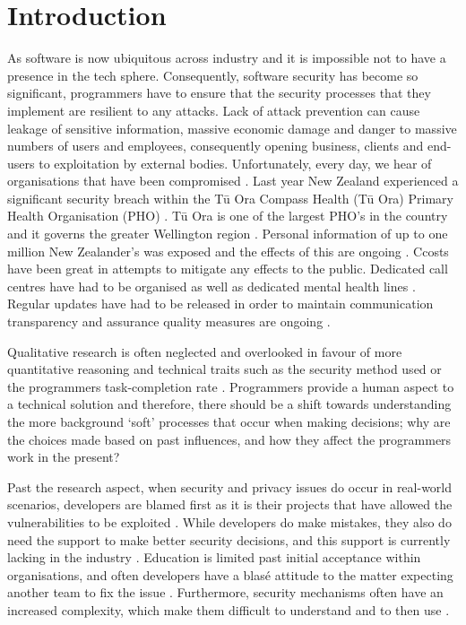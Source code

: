 \chapter{Introduction}\label{C:intro}

\par As software is now ubiquitous across industry and it is impossible not to have a presence in the tech sphere. Consequently, software security has become so significant, programmers have to ensure that the security processes that they implement are resilient to any attacks. Lack of attack prevention can cause leakage of sensitive information, massive economic damage and danger to massive numbers of users and employees, consequently opening business, clients and end-users to exploitation by external bodies. Unfortunately, every day, we hear of organisations that have been compromised \cite{1}. Last year New Zealand experienced a significant security breach within the Tū Ora Compass Health (Tū Ora) Primary Health Organisation (PHO) \cite{incident}. Tū Ora is one of the largest PHO's in the country and it governs the greater Wellington region \cite{incident}. Personal information of up to one million New Zealander's was exposed and the effects of this are ongoing \cite{incident}. Ccosts have been great in attempts to mitigate any effects to the public. Dedicated call centres have had to be organised as well as dedicated mental health lines \cite{healthpol, incident}. Regular updates have had to be released in order to maintain communication transparency and assurance quality measures are ongoing \cite{healthpol, incident}.  
\newline
\par Qualitative research is often neglected and overlooked in favour of more quantitative reasoning and technical traits such as the security method used or the programmers task-completion rate \cite{3}. Programmers provide a human aspect to a technical solution and therefore, there should be a shift towards understanding the more background ‘soft’ processes that occur when making decisions; why are the choices made based on past influences, and how they affect the programmers work in the present? 
\newline
\par Past the research aspect, when security and privacy issues do occur in real-world scenarios, developers are blamed first as it is their projects that have allowed the vulnerabilities to be exploited \cite{4}. While developers do make mistakes, they also do need the support to make better security decisions, and this support is currently lacking in the industry \cite{4}. Education is limited past initial acceptance within organisations, and often developers have a blasé attitude to the matter expecting another team to fix the issue \cite{5}. Furthermore, security mechanisms often have an increased complexity, which make them difficult to understand and to then use \cite{6}.
